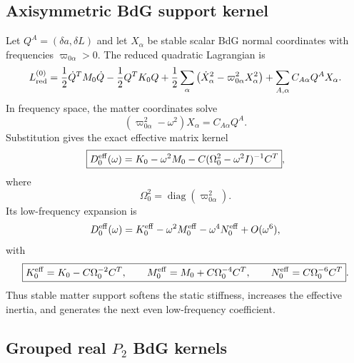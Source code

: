 \subsection{Axisymmetric BdG support kernel}
\label{subsec:part01-axisymmetric-BdG-kernel}

Let \(Q^A=(\delta a,\delta L)\) and let \(X_\alpha\) be stable scalar BdG normal coordinates with frequencies \(\varpi_{0\alpha}>0\).  The reduced quadratic Lagrangian is
\begin{equation}
\label{eq:part01-Lred0-BdG}
L_{\rm red}^{(0)}
=
\frac12\dot Q^TM_0\dot Q-\frac12Q^TK_0Q
+
\frac12\sum_\alpha\left(\dot X_\alpha^2-\varpi_{0\alpha}^2X_\alpha^2\right)
+
\sum_{A,\alpha}C_{A\alpha}Q^AX_\alpha.
\end{equation}
In frequency space, the matter coordinates solve
\begin{equation}
(\varpi_{0\alpha}^2-\omega^2)X_\alpha=C_{A\alpha}Q^A.
\end{equation}
Substitution gives the exact effective matrix kernel
\begin{equation}
\label{eq:part01-D0eff-BdG}
\boxed{
D_0^{\rm eff}(\omega)
=
K_0-\omega^2M_0-C(\Omega_0^2-\omega^2I)^{-1}C^T},
\end{equation}
where
\begin{equation}
\Omega_0^2=\operatorname{diag}(\varpi_{0\alpha}^2).
\end{equation}
Its low-frequency expansion is
\begin{equation}
D_0^{\rm eff}(\omega)
=
K_0^{\rm eff}-\omega^2M_0^{\rm eff}-\omega^4N_0^{\rm eff}+O(\omega^6),
\end{equation}
with
\begin{equation}
\label{eq:part01-BdG-axisymmetric-moments}
\boxed{
K_0^{\rm eff}=K_0-C\Omega_0^{-2}C^T,
\qquad
M_0^{\rm eff}=M_0+C\Omega_0^{-4}C^T,
\qquad
N_0^{\rm eff}=C\Omega_0^{-6}C^T}.
\end{equation}
Thus stable matter support softens the static stiffness, increases the effective inertia, and generates the next even low-frequency coefficient.

\subsection{Grouped real \texorpdfstring{\(P_2\)}{P2} BdG kernels}
\label{subsec:part01-p2-BdG-kernels}

